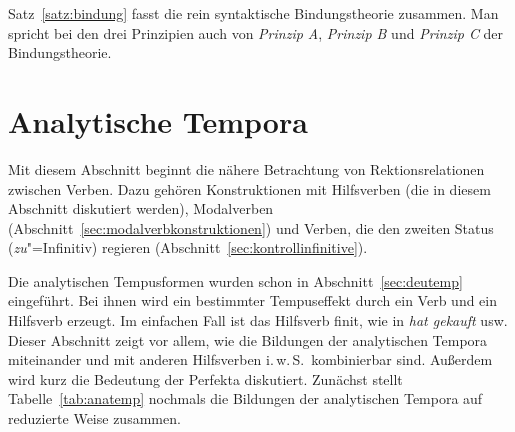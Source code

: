 Satz~\ref{satz:bindung} fasst die rein syntaktische Bindungstheorie zusammen.
Man spricht bei den drei Prinzipien auch von \textit{Prinzip A}, \textit{Prinzip B} und \textit{Prinzip C} der Bindungstheorie.





\section{Analytische Tempora}

\label{sec:analytischetempora}

Mit diesem Abschnitt beginnt die nähere Betrachtung von Rektionsrelationen zwischen Verben.
Dazu gehören Konstruktionen mit Hilfsverben (die in diesem Abschnitt diskutiert werden), Modalverben (Abschnitt~\ref{sec:modalverbkonstruktionen}) und Verben, die den zweiten Status (\textit{zu}"=Infinitiv) regieren (Abschnitt~\ref{sec:kontrollinfinitive}).

Die analytischen Tempusformen wurden schon in Abschnitt~\ref{sec:deutemp} eingeführt.
Bei ihnen wird ein bestimmter Tempuseffekt durch ein Verb und ein Hilfsverb erzeugt.
Im einfachen Fall ist das Hilfsverb finit, wie in \textit{hat gekauft} usw.
Dieser Abschnitt zeigt vor allem, wie die Bildungen der analytischen Tempora miteinander und mit anderen Hilfsverben i.\,w.\,S.\ kombinierbar sind.
Außerdem wird kurz die Bedeutung der Perfekta diskutiert.
Zunächst stellt Tabelle~\ref{tab:anatemp} nochmals die Bildungen der analytischen Tempora auf reduzierte Weise zusammen.

